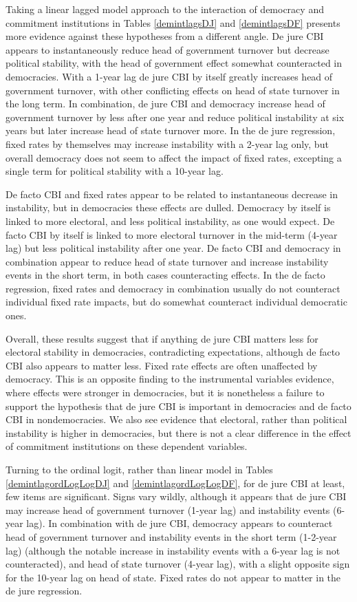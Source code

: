 \documentclass{article}
\begin{document}
    Taking a linear lagged model approach to the interaction of democracy and commitment institutions in Tables \ref*{demintlagsDJ} and \ref*{demintlagsDF} presents more evidence against these hypotheses from a different angle. De jure CBI appears to instantaneously reduce head of government turnover but decrease political stability, with the head of government effect somewhat counteracted in democracies. With a 1-year lag de jure CBI by itself greatly increases head of government turnover, with other conflicting effects on head of state turnover in the long term. In combination, de jure CBI and democracy increase head of government turnover by less after one year and reduce political instability at six years but later increase head of state turnover more. In the de jure regression, fixed rates by themselves may increase instability with a 2-year lag only, but overall democracy does not seem to affect the impact of fixed rates, excepting a single term for political stability with a 10-year lag.

    De facto CBI and fixed rates appear to be related to instantaneous decrease in instability, but in democracies these effects are dulled. Democracy by itself is linked to more electoral, and less political instability, as one would expect. De facto CBI by itself is linked to more electoral turnover in the mid-term (4-year lag) but less political instability after one year.  De facto CBI and democracy in combination appear to reduce head of state turnover and increase instability events in the short term, in both cases counteracting effects. In the de facto regression, fixed rates and democracy in combination usually do not counteract individual fixed rate impacts, but do somewhat counteract individual democratic ones.

    Overall, these results suggest that if anything de jure CBI matters less for electoral stability in democracies, contradicting expectations, although de facto CBI also appears to matter less. Fixed rate effects are often unaffected by democracy. This is an opposite finding to the instrumental variables evidence, where effects were stronger in democracies, but it is nonetheless a failure to support the hypothesis that de jure CBI is important in democracies and de facto CBI in nondemocracies. We also see evidence that electoral, rather than political instability is higher in democracies, but there is not a clear difference in the effect of commitment institutions on these dependent variables.

    Turning to the ordinal logit, rather than linear model in Tables \ref*{demintlagordLogLogDJ} and \ref*{demintlagordLogLogDF}, for de jure CBI at least, few items are significant. Signs vary wildly, although it appears that de jure CBI may increase head of government turnover (1-year lag) and instability events (6-year lag). In combination with de jure CBI, democracy appears to counteract head of government turnover and instability events in the short term (1-2-year lag) (although the notable increase in instability events with a 6-year lag is not counteracted), and head of state turnover (4-year lag), with a slight opposite sign for the 10-year lag on head of state. Fixed rates do not appear to matter in the de jure regression.
\end{document}
